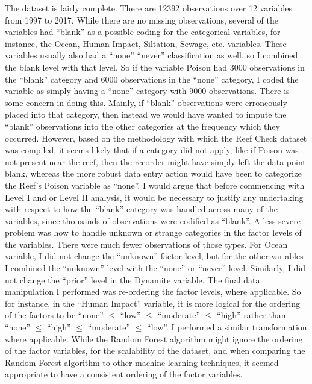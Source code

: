 \documentclass{article}
\begin{document}
The dataset is fairly complete. There are 12392 observations over 12 variables from 1997 to 2017. While there are no missing observations, several of the variables had ``blank'' as a possible coding for the categorical variables, for instance, the Ocean, Human Impact, Siltation, Sewage, etc. variables. These variables usually also had a ``none'' ``never'' classification as well, so I combined the blank level with that level. So if the variable Poison had 3000 observations in the ``blank'' category and 6000 observations in the ``none'' category, I coded the variable as simply having a ``none'' category with 9000 observations. There is some concern in doing this. Mainly, if ``blank'' observations were erroneously placed into that category, then instead we would have wanted to impute the ``blank'' observations into the other categories at the frequency which they occurred. However, based on the methodology with which the Reef Check dataset was compiled, it seems likely that if a category did not apply, like if Poison was not present near the reef, then the recorder might have simply left the data point blank, whereas the more robust data entry action would have been to categorize the Reef's Poison variable as ``none''. I would argue that before commencing with Level I and or Level II analysis, it would be necessary to justify any undertaking with respect to how the ``blank'' category was handled across many of the variables, since thousands of observations were codified as ``blank''. A less severe problem was how to handle unknown or strange categories in the factor levels of the variables. There were much fewer observations of those types. For Ocean variable, I did not change the ``unknown'' factor level, but for the other variables I combined the ``unknown'' level with the ``none'' or ``never'' level. Similarly, I did not change the ``prior'' level in the Dynamite variable. The final data manipulation I performed was re-ordering the factor levels, where applicable. So for instance, in the ``Human Impact'' variable, it is more logical for the ordering of the factors to be ``none'' $\leq$ ``low'' $\leq$ ``moderate'' $\leq$ ``high'' rather than ``none'' $\leq$ ``high'' $\leq$ ``moderate'' $\leq$ ``low''. I performed a similar transformation where applicable. While the Random Forest algorithm might ignore the ordering of the factor variables, for the scalability of the dataset, and when comparing the Random Forest algorithm to other machine learning techniques, it seemed appropriate to have a consistent ordering of the factor variables.
\end{document}
